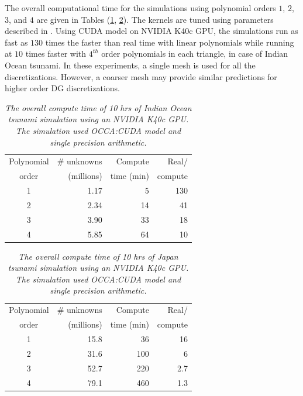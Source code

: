  The overall computational time for the simulations using polynomial orders $1$, $2$, $3$, and $4$ are given in Tables (\ref{tab:pasidgTiming}, \ref{tab:worldOceanTiming}).  The kernels are tuned using parameters described in \cite{gandham2014swe}. Using CUDA model on NVIDIA K40c GPU, the simulations run as fast as $130$ times the faster than real time with linear polynomials while running at $10$ times faster with $4^{th}$ order polynomials in each triangle, in case of Indian Ocean tsunami.
In these experiments, a single mesh is used for all the discretizations. However, a coarser mesh may provide similar predictions for higher order DG discretizations.
\begin{table}[h!]
\begin{center}
\begin{tabular}{crrr}
\hline
Polynomial & \# unknowns & Compute& Real/  \\
order & (millions)& time (min) & compute\\ \hline
1 & 1.17 &  5 & 130\\
2 & 2.34 & 14 &  41\\
3 & 3.90 & 33 &  18\\
4 & 5.85 & 64 &  10\\\hline
\end{tabular}
\caption{\emph{The overall compute time of 10 hrs of Indian Ocean tsunami simulation using an NVIDIA K40c GPU. The simulation used OCCA:CUDA model and single precision arithmetic.}}
\label{tab:pasidgTiming}
\end{center}
\end{table}

\begin{table}[h!]
\begin{center}
\begin{tabular}{crrr}
\hline
Polynomial & \# unknowns & Compute& Real/  \\
order & (millions)& time (min) & compute\\ \hline
1 & 15.8 &  36 & 16\\
2 & 31.6 & 100 &  6\\
3 & 52.7 & 220 & 2.7\\
4 & 79.1 & 460 & 1.3\\\hline
\end{tabular}
\caption{\emph{The overall compute time of 10 hrs of Japan tsunami simulation using an NVIDIA K40c GPU. 
The simulation used OCCA:CUDA model and single precision arithmetic.}}
\label{tab:worldOceanTiming}
\end{center}
\end{table}
